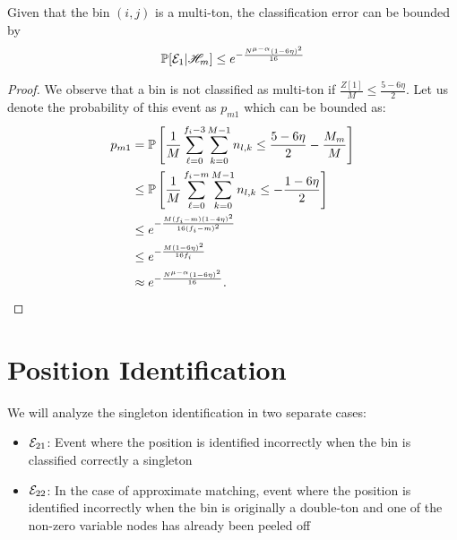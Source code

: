 \begin{lemma}
\label{Lem:MultitonClassif}
Given that the bin $(i,j)$ is a multi-ton, the classification error can be bounded by
\begin{align*}
\mathbb{P}[\mathcal{E}_1|\mathscr{H}_m]\leq e^{-\frac{N^{\mu-\alpha}(1-6\eta)^2}{16}}
\end{align*}
\end{lemma}
\begin{proof}
We observe that a bin is not classified as multi-ton if $\frac{Z[1]}{M}\leq\frac{5-6\eta}{2}$. Let us denote the probability of this event as $p_{m1}$ which can be bounded as:
\begin{align*}
p_{m1}&=\mathbb{P}\left[\frac{1}{M}\sum\limits_{\ell=0}^{f_{i}-3}\sum\limits_{k=0}^{M-1} n_{l,k}\leq\frac{5-6\eta}{2}-\frac{M_m}{M}\right]\\
&\leq \mathbb{P}\left[\frac{1}{M}\sum\limits_{\ell=0}^{f_{i}-m}\sum\limits_{k=0}^{M-1} n_{l,k}\leq-\frac{1-6\eta}{2}\right]\\
&\leq e^{-\frac{M(f_i-m)(1-4\eta)^2}{16(f_i-m)^{2}}}\\
&\leq e^{-\frac{M(1-6\eta)^2}{16 f_i}}\\
 &\approx e^{-\frac{N^{\mu-\alpha}(1-6\eta)^2}{16}}.
\end{align*} 
\end{proof}

\section{Position Identification}
\label{Append:PositionIdentif}
We will analyze the singleton identification in two separate cases:
\begin{itemize}
\item $\mathcal{E}_{21}$: Event where the position is identified incorrectly when the bin is classified  correctly a singleton
\item $\mathcal{E}_{22}$: In the case of approximate matching, event where the position is identified incorrectly when the bin is originally a double-ton and one of the non-zero variable nodes has already been peeled off
\end{itemize}

